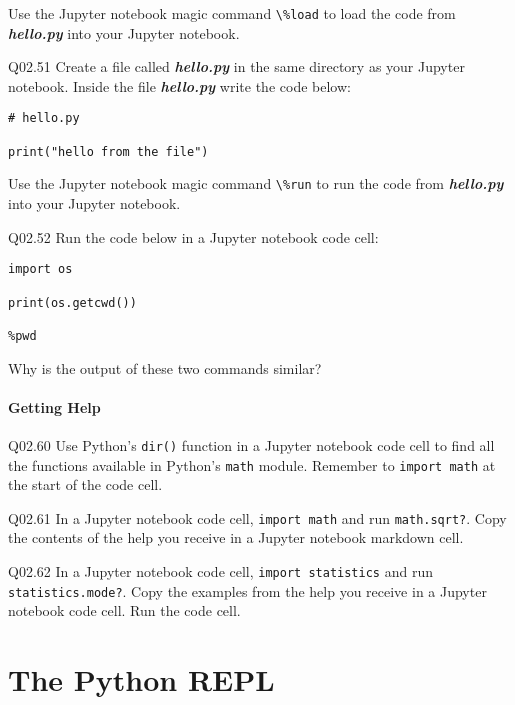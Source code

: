 \documentclass{book}
\newcommand{\passthrough}[1]{#1}
\begin{document}
Use the Jupyter notebook magic command \passthrough{\lstinline!\%load!}
to load the code from \textbf{\emph{hello.py}} into your Jupyter
notebook.

Q02.51 Create a file called \textbf{\emph{hello.py}} in the same
directory as your Jupyter notebook. Inside the file
\textbf{\emph{hello.py}} write the code below:

\begin{lstlisting}
# hello.py

print("hello from the file")
\end{lstlisting}

Use the Jupyter notebook magic command \passthrough{\lstinline!\%run!}
to run the code from \textbf{\emph{hello.py}} into your Jupyter
notebook.

Q02.52 Run the code below in a Jupyter notebook code cell:

\begin{lstlisting}
import os

print(os.getcwd())

%pwd
\end{lstlisting}

Why is the output of these two commands similar?
    




    
        \hypertarget{getting-help}{%
\subsubsection{Getting Help}\label{getting-help}}

Q02.60 Use Python's \passthrough{\lstinline!dir()!} function in a
Jupyter notebook code cell to find all the functions available in
Python's \passthrough{\lstinline!math!} module. Remember to
\passthrough{\lstinline!import math!} at the start of the code cell.

Q02.61 In a Jupyter notebook code cell,
\passthrough{\lstinline!import math!} and run
\passthrough{\lstinline!math.sqrt?!}. Copy the contents of the help you
receive in a Jupyter notebook markdown cell.

Q02.62 In a Jupyter notebook code cell,
\passthrough{\lstinline!import statistics!} and run
\passthrough{\lstinline!statistics.mode?!}. Copy the examples from the
help you receive in a Jupyter notebook code cell. Run the code cell.
    




    
        \hypertarget{the-python-repl}{%
\chapter{The Python REPL}\label{the-python-repl}}
    
\end{document}
